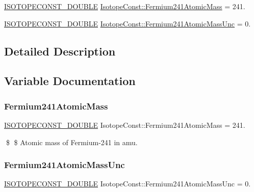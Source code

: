 \begin{DoxyCompactItemize}
\item 
\mbox{\hyperlink{group___isotope_const-_macros_ga8f45a7272ce02c0b4c65c44636ed719a}{I\+S\+O\+T\+O\+P\+E\+C\+O\+N\+S\+T\+\_\+\+D\+O\+U\+B\+LE}} \mbox{\hyperlink{group___isotope_const-_fermium-_fm241_ga9e983937de8106f95d0b2d2f6eefe37d}{Isotope\+Const\+::\+Fermium241\+Atomic\+Mass}} = 241.
\item 
\mbox{\hyperlink{group___isotope_const-_macros_ga8f45a7272ce02c0b4c65c44636ed719a}{I\+S\+O\+T\+O\+P\+E\+C\+O\+N\+S\+T\+\_\+\+D\+O\+U\+B\+LE}} \mbox{\hyperlink{group___isotope_const-_fermium-_fm241_gaf28a465317190d149c8a77e69295c8a6}{Isotope\+Const\+::\+Fermium241\+Atomic\+Mass\+Unc}} = 0.
\end{DoxyCompactItemize}


\subsection{Detailed Description}


\subsection{Variable Documentation}
\mbox{\label{group___isotope_const-_fermium-_fm241_ga9e983937de8106f95d0b2d2f6eefe37d}} 
\subsubsection{\texorpdfstring{Fermium241\+Atomic\+Mass}{Fermium241AtomicMass}}
{\footnotesize\ttfamily \mbox{\hyperlink{group___isotope_const-_macros_ga8f45a7272ce02c0b4c65c44636ed719a}{I\+S\+O\+T\+O\+P\+E\+C\+O\+N\+S\+T\+\_\+\+D\+O\+U\+B\+LE}} Isotope\+Const\+::\+Fermium241\+Atomic\+Mass = 241.}

\$ \$ Atomic mass of Fermium-\/241 in amu. \mbox{\label{group___isotope_const-_fermium-_fm241_gaf28a465317190d149c8a77e69295c8a6}} 
\subsubsection{\texorpdfstring{Fermium241\+Atomic\+Mass\+Unc}{Fermium241AtomicMassUnc}}
{\footnotesize\ttfamily \mbox{\hyperlink{group___isotope_const-_macros_ga8f45a7272ce02c0b4c65c44636ed719a}{I\+S\+O\+T\+O\+P\+E\+C\+O\+N\+S\+T\+\_\+\+D\+O\+U\+B\+LE}} Isotope\+Const\+::\+Fermium241\+Atomic\+Mass\+Unc = 0.}

